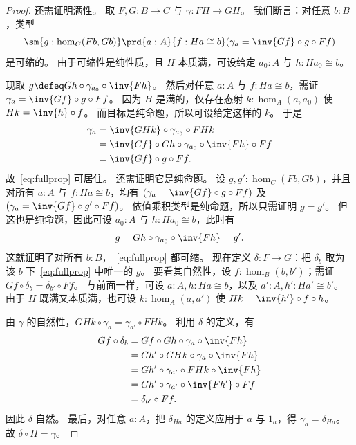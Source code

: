 \begin{proof}
  还需证明满性。
  取 $F,G:B\to C$ 与 $\gamma:FH \to GH$。
  我们断言：对任意 $b:B$，类型
  \begin{equation}\label{eq:fullprop}
    \sm{g:\hom_C(Fb,Gb)} \prd{a:A}{f:Ha\cong b} (\gamma_a =  \inv{Gf}\circ g\circ Ff)
  \end{equation}
  是可缩的。
  由于可缩性是纯性质，且 $H$ 本质满，可设给定 $a_0:A$ 与 $h:Ha_0\cong b$。

  现取 $g\defeq Gh \circ \gamma_{a_0} \circ \inv{Fh}$。
  然后对任意 $a:A$ 与 $f:Ha\cong b$，需证 $\gamma_a =  \inv{Gf}\circ g\circ Ff$。
  因为 $H$ 是满的，仅存在态射 $k:\hom_A(a,a_0)$ 使 $Hk = \inv{h}\circ f$。
  而目标是纯命题，所以可设给定这样的 $k$。
  于是
  \begin{align*}
    \gamma_a &= \inv{GHk}\circ \gamma_{a_0} \circ FHk\\
    &= \inv{Gf} \circ Gh \circ \gamma_{a_0} \circ \inv{Fh} \circ Ff\\
    &= \inv{Gf}\circ g\circ Ff.
  \end{align*}
  故~\eqref{eq:fullprop} 可居住。
  还需证明它是纯命题。
  设 $g,g':\hom_C(Fb, Gb)$，并且对所有 $a:A$ 与 $f:Ha\cong b$，均有 $(\gamma_a =  \inv{Gf}\circ g\circ Ff)$ 及 $(\gamma_a =  \inv{Gf}\circ g'\circ Ff)$。
  依值乘积类型是纯命题，所以只需证明 $g=g'$。
  但这也是纯命题，因此可设 $a_0:A$ 与 $h:Ha_0\cong b$，此时有
  \[ g = Gh \circ \gamma_{a_0} \circ \inv{Fh} = g'.\]
  这就证明了对所有 $b:B$，~\eqref{eq:fullprop} 都可缩。
  现在定义 $\delta:F\to G$：把 $\delta_b$ 取为该 $b$ 下~\eqref{eq:fullprop} 中唯一的 $g$。
  要看其自然性，设 $f:\hom_B(b,b')$；需证 $Gf \circ \delta_b = \delta_{b'}\circ Ff$。
  与前面一样，可设 $a:A,h:Ha\cong b$，以及 $a':A,h':Ha'\cong b'$。
  由于 $H$ 既满又本质满，也可设 $k:\hom_A(a,a')$ 使 $Hk = \inv{h'}\circ f\circ h$。

  由 $\gamma$ 的自然性，$GHk\circ \gamma_a = \gamma_{a'} \circ FHk$。
  利用 $\delta$ 的定义，有
  \begin{align*}
    Gf \circ \delta_b
    &= Gf \circ Gh \circ \gamma_a \circ \inv{Fh}\\
    &= Gh' \circ GHk\circ \gamma_a \circ \inv{Fh}\\
    &= Gh' \circ \gamma_{a'} \circ FHk \circ \inv{Fh}\\
    &= Gh' \circ \gamma_{a'} \circ \inv{Fh'} \circ Ff\\
    &= \delta_{b'} \circ Ff.
  \end{align*}
  因此 $\delta$ 自然。
  最后，对任意 $a:A$，把 $\delta_{Ha}$ 的定义应用于 $a$ 与 $1_a$，得 $\gamma_a = \delta_{Ha}$。
  故 $\delta \circ H = \gamma$。
\end{proof}

